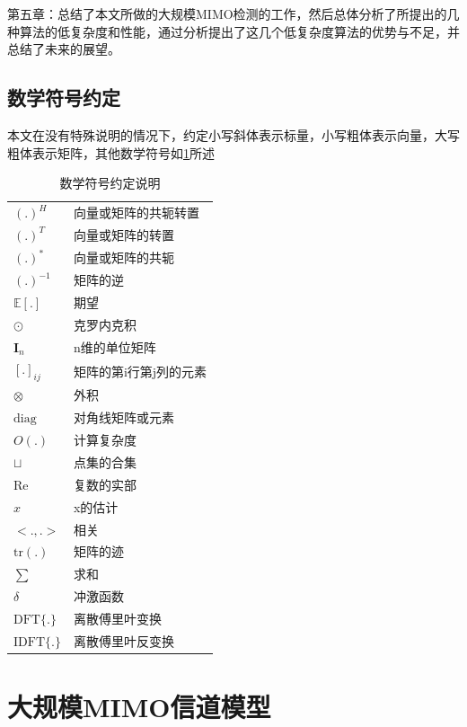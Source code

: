 \documentclass[bachelor,nocolorlinks, printoneside]{seuthesis} %
\begin{document}
\begin{Main}
第五章：总结了本文所做的大规模MIMO检测的工作，然后总体分析了所提出的几种算法的低复杂度和性能，通过分析提出了这几个低复杂度算法的优势与不足，并总结了未来的展望。

\section{数学符号约定}
本文在没有特殊说明的情况下，约定小写斜体表示标量，小写粗体表示向量，大写粗体表示矩阵，其他数学符号如\ref{tab:symbol}所述

\begin{table}[htbp]
	\centering
	\caption{\label{tab:symbol}数学符号约定说明}
	\begin{tabular}{ll}
		\toprule
		$(.)^H$ & 向量或矩阵的共轭转置 \\
		$(.)^T$ & 向量或矩阵的转置 \\
		$(.)^*$ & 向量或矩阵的共轭 \\
		$(.)^{-1}$ & 矩阵的逆 \\
		$\mathbb{E}[.]$ & 期望 \\
		$\odot$ & 克罗内克积 \\
		$\mathbf{I}_n$ & n维的单位矩阵  \\
		$[.]_{ij}$ & 矩阵的第i行第j列的元素 \\
		$\otimes$ & 外积 \\
		$\mathrm{diag}$ & 对角线矩阵或元素\\
		$O(.)$ & 计算复杂度 \\
		$\sqcup$ & 点集的合集 \\
		$\mathrm{Re}$ & 复数的实部 \\
		$\hat{x}$ & x的估计 \\
		$<.,.>$ & 相关\\
		$\mathrm{tr}(.)$ & 矩阵的迹 \\
		$\sum$ & 求和 \\
		$\delta$ & 冲激函数 \\
		$\mathrm{DFT}\lbrace.\rbrace$ & 离散傅里叶变换\\
		$\mathrm{IDFT}\lbrace.\rbrace$ & 离散傅里叶反变换\\
		\bottomrule
	\end{tabular}
\end{table}



\chapter{大规模MIMO信道模型}

\end{Main}
\end{document}
